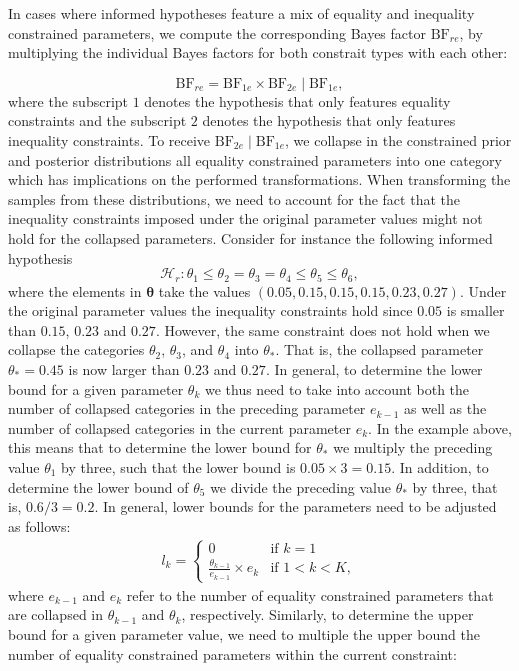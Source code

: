 \begin{appendix}
In cases where informed hypotheses feature a mix of equality and
inequality constrained parameters, we compute the corresponding Bayes
factor \(\text{BF}_{re}\), by multiplying the individual Bayes factors
for both constrait types with each other:

\[
\text{BF}_{re}
= \text{BF}_{1e} \times \text{BF}_{2e} \mid \text{BF}_{1e},
\] where the subscript \(1\) denotes the hypothesis that only features
equality constraints and the subscript \(2\) denotes the hypothesis that
only features inequality constraints. To receive
\(\text{BF}_{2e} \mid \text{BF}_{1e}\), we collapse in the constrained
prior and posterior distributions all equality constrained parameters
into one category which has implications on the performed
transformations. When transforming the samples from these distributions,
we need to account for the fact that the inequality constraints imposed
under the original parameter values might not hold for the collapsed
parameters. Consider for instance the following informed hypothesis
\[\mathcal{H}_r: \theta_1 \leq \theta_2 = \theta_3 = \theta_4 \leq \theta_5 \leq \theta_6,\]
where the elements in \(\boldsymbol{\theta}\) take the values
\((0.05, 0.15, 0.15, 0.15, 0.23, 0.27)\). Under the original parameter
values the inequality constraints hold since \(0.05\) is smaller than
\(0.15\), \(0.23\) and \(0.27\). However, the same constraint does not
hold when we collapse the categories \(\theta_2\), \(\theta_3\), and
\(\theta_4\) into \(\theta_*\). That is, the collapsed parameter
\(\theta_* = 0.45\) is now larger than \(0.23\) and \(0.27\). In
general, to determine the lower bound for a given parameter \(\theta_k\)
we thus need to take into account both the number of collapsed
categories in the preceding parameter \(e_{k-1}\) as well as the number
of collapsed categories in the current parameter \(e_{k}\). In the
example above, this means that to determine the lower bound for
\(\theta_*\) we multiply the preceding value \(\theta_1\) by three, such
that the lower bound is \(0.05 \times 3 = 0.15\). In addition, to
determine the lower bound of \(\theta_5\) we divide the preceding value
\(\theta_*\) by three, that is, \(0.6/3 = 0.2\). In general, lower
bounds for the parameters need to be adjusted as follows: \begin{align}
  l_k = \left.
  \begin{cases}
      0 & \text{if } k = 1 \\
      \frac{\theta_{k - 1}}{e_{k-1}} \times e_k & \text{if } 1 < k < K,
  \end{cases}
    \right.
\end{align} where \(e_{k-1}\) and \(e_k\) refer to the number of
equality constrained parameters that are collapsed in \(\theta_{k - 1}\)
and \(\theta_{k}\), respectively. Similarly, to determine the upper
bound for a given parameter value, we need to multiple the upper bound
the number of equality constrained parameters within the current
constraint:


\end{appendix}

